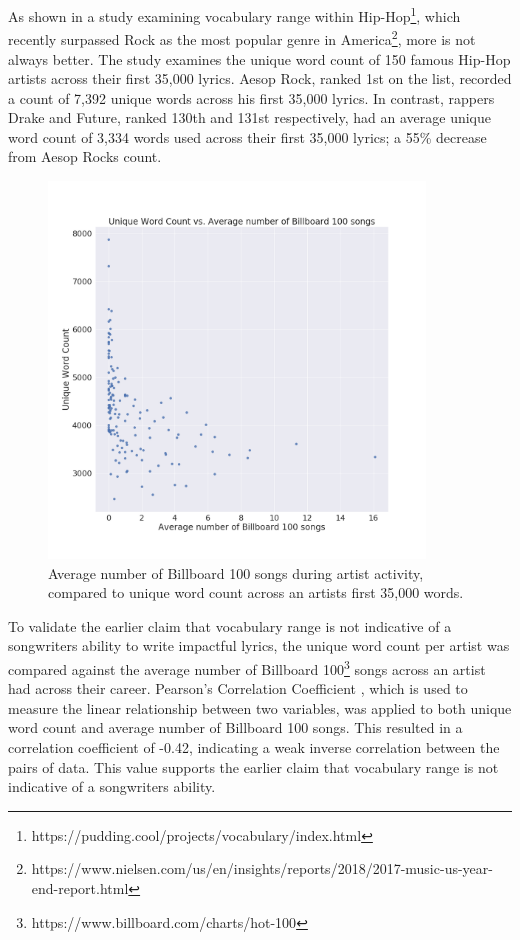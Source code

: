 \noindent
\newline
As shown in a study examining vocabulary range within Hip-Hop\footnote{https://pudding.cool/projects/vocabulary/index.html}, which recently surpassed Rock as the most popular genre in America\footnote{https://www.nielsen.com/us/en/insights/reports/2018/2017-music-us-year-end-report.html}, more is not always better. The study examines the unique word count of 150 famous Hip-Hop artists across their first 35,000 lyrics. Aesop Rock, ranked 1st on the list, recorded a count of 7,392 unique words across his first 35,000 lyrics. In contrast, rappers Drake and Future, ranked 130th and 131st respectively, had an average unique word count of 3,334 words used across their first 35,000 lyrics; a 55\% decrease from Aesop Rocks count. 
\begin{figure}[h]	
	\includegraphics[width=10cm, height=10cm]{./figures/fig1}
	\centering
	\caption{Average number of Billboard 100 songs during artist activity, compared to unique word count across an artists first 35,000 words.}
	\label{fig:fig1}
\end{figure}

\noindent
\newline
To validate the earlier claim that vocabulary range is not indicative of a songwriters ability to write impactful lyrics, the unique word count per artist was compared against the average number of Billboard 100\footnote{https://www.billboard.com/charts/hot-100} songs across an artist had across their career. Pearson's Correlation Coefficient , which is used to measure the linear relationship between two variables, was applied to both unique word count and average number of Billboard 100 songs. This resulted in a correlation coefficient of -0.42, indicating a weak inverse correlation between the pairs of data. This value supports the earlier claim that vocabulary range is not indicative of a songwriters ability.

